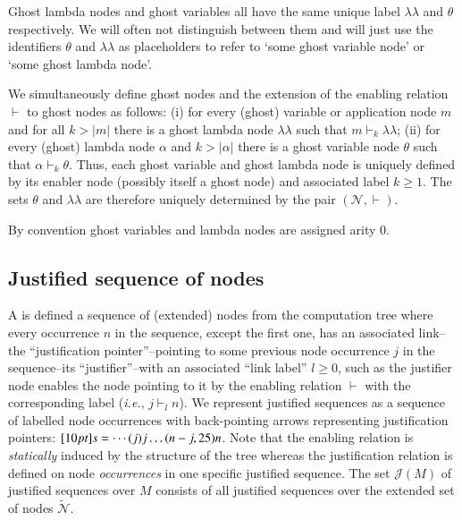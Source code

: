 \documentclass{elsarticle}
\makeatletter
\theoremstyle{plain}
\theoremstyle{definition}
\theoremstyle{remark}
\newcommand\Nodes{\mathcal{N}}%
\newcommand\ExtendedNodes{\tilde{\Nodes}}
\newcommand{\ghostlmd}{{\lambda\!\!\lambda}}
\newcommand{\ghostvar}{\theta}
\newcommand{\enables}{\vdash} %
\renewcommand\ie{{\it i.e.\@\xspace}}
\def\justseqset{\mathcal{J}}
\makeatother
\begin{document}
Ghost lambda nodes and ghost variables all have the same unique label
$\ghostlmd$ and $\ghostvar$ respectively. We will often not distinguish between them and will just use the identifiers $\ghostvar$ and $\ghostlmd$ as placeholders to refer to `some ghost variable node' or `some ghost lambda node'.

We simultaneously define ghost nodes and the extension of the enabling relation $\enables$ to ghost nodes as follows: (i) for every (ghost) variable or application node $m$ and for all $k>|m|$ there is a ghost lambda node $\ghostlmd$ such that $m \enables_k \ghostlmd$; (ii) for every (ghost) lambda node $\alpha$ and $k>|\alpha|$ there is a ghost variable node $\ghostvar$ such that $\alpha \enables_k \ghostvar$. Thus, each ghost variable and ghost lambda node is uniquely defined by its enabler node (possibly itself a ghost node) and associated label $k\geq 1$.
The sets $\ghostvar$ and $\ghostlmd$ are therefore uniquely determined by the pair $(\Nodes, \enables)$.

By convention ghost variables and lambda nodes are assigned arity $0$.

\subsection{Justified sequence of nodes}
\label{sec:justseq}

A  is defined a sequence of (extended) nodes from the computation tree where every occurrence $n$ in the sequence, except the first one, has an associated link--the ``justification pointer''--pointing to some previous node occurrence $j$ in the sequence--its ``justifier''--with an associated ``link label'' $l\geq0$, such as the justifier node enables the node pointing to it by the enabling relation $\enables$ with the corresponding label (\ie, $j \enables_l n$). We represent justified sequences as a sequence of labelled node occurrences with back-pointing arrows representing justification pointers:
$\Pstr[10pt]{ s = \cdots (j){j} \ldots (n-j,25){n} }$. Note that the enabling relation is \emph{statically} induced by the structure of the tree whereas the justification relation is defined on node \emph{occurrences} in one specific justified sequence. The set $\justseqset(M)$ of justified sequences over $M$ consists of all justified sequences over the extended set of nodes $\ExtendedNodes$.
\end{document}
